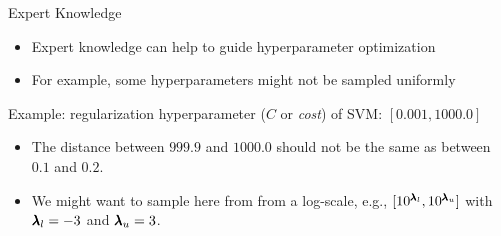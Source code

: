 
\subtitle{Practical Application}





\maketitle



\begin{frame}{Expert Knowledge}

\begin{itemize}
	\item Expert knowledge can help to guide hyperparameter optimization
	\item For example, some hyperparameters might not be sampled uniformly
\end{itemize}


Example: regularization hyperparameter ($C$ or \emph{cost}) of SVM: $[0.001, 1000.0]$

\begin{itemize}
	\item The distance between $999.9$ and $1000.0$ should not be the same as between $0.1$ and $0.2$.
  \item We might want to sample here from from a log-scale, e.g., $[10^{\pmb{\lambda}_l}, 10^{\pmb{\lambda}_u}]$ with $\pmb{\lambda}_l = -3$ and $\pmb{\lambda}_u = 3$.
\end{itemize}

\begin{figure}[htb]
\centering
\end{figure}


\end{frame}
